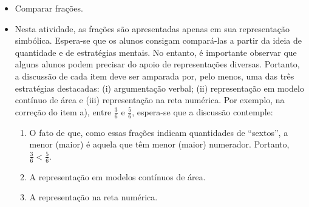 \begin{atividade}\label{chap3-ativ16}
\objetivos
  \begin{itemize}
  \item Comparar frações.
  \end{itemize}

\discussoes

   \begin{itemize}
  \item Nesta atividade, as frações são apresentadas apenas em sua representação simbólica. Espera-se que os alunos consigam compará-las a partir da ideia de quantidade e de estratégias mentais. No entanto, é importante observar que alguns alunos podem precisar do apoio de representações diversas. Portanto, a discussão de cada item deve ser amparada por, pelo menos, uma das três estratégias destacadas: (i) argumentação verbal; (ii) representação em modelo contínuo de área e (iii) representação na reta numérica. Por exemplo, na correção do item a), entre $\frac{3}{6}$ e $\frac{5}{6}$, espera-se que a discussão contemple:

   \begin{enumerate}[label=\roman*)]
    \item O fato de que, como essas frações indicam quantidades de ``sextos'', a menor (maior) é aquela que têm menor (maior) numerador. Portanto, $\frac{3}{6}< \frac{5}{6}$.
    \item A representação em modelos contínuos de área.
\begin{center}
\end{center}
    \item A representação na reta numérica. 
      \begin{center}
\end{center}
\end{enumerate}
\end{itemize}
\end{atividade}

